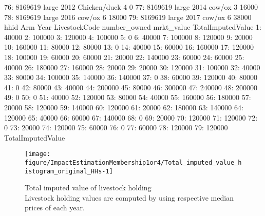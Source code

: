 \begin{Schunk}
\begin{Soutput}
76: 8169619       large 2012  Chicken/duck            4          0
77: 8169619       large 2014        cow/ox            3      16000
78: 8169619       large 2016        cow/ox            6      18000
79: 8169619       large 2017        cow/ox            6      38000
       hhid         Arm Year LivestockCode number_owned mrkt_value
    TotalImputedValue
 1:             40000
 2:            100000
 3:            120000
 4:            100000
 5:                 0
 6:             40000
 7:            100000
 8:            120000
 9:             20000
10:            160000
11:             80000
12:             80000
13:                 0
14:             40000
15:             60000
16:            160000
17:            120000
18:            100000
19:             60000
20:             60000
21:             20000
22:            140000
23:             60000
24:             60000
25:             40000
26:            180000
27:            160000
28:             20000
29:             20000
30:            120000
31:            100000
32:             40000
33:             80000
34:            100000
35:            140000
36:            140000
37:                 0
38:             60000
39:            120000
40:             80000
41:                 0
42:             80000
43:             40000
44:            200000
45:             80000
46:            300000
47:            240000
48:            200000
49:                 0
50:                 0
51:             40000
52:            120000
53:             80000
54:             40000
55:            160000
56:            180000
57:             20000
58:            120000
59:            140000
60:            120000
61:             20000
62:            180000
63:            140000
64:            120000
65:             40000
66:             60000
67:            140000
68:                 0
69:             20000
70:            120000
71:            120000
72:                 0
73:             20000
74:            120000
75:             60000
76:                 0
77:             60000
78:            120000
79:            120000
    TotalImputedValue
\end{Soutput}
\end{Schunk}
\begin{Schunk}
\begin{figure}

{\centering \texttt{[image: figure/ImpactEstimationMembership1or4/Total\_imputed\_value\_histogram\_original\_HHs-1]} 

}

\caption{Total imputed value of livestock holding\\ {\footnotesize Livestock holding values are computed by using respective median prices of each year.\setlength{\baselineskip}{8pt}}}\label{Figure Total imputed value histogram original HHs}
\end{figure}
\end{Schunk}
